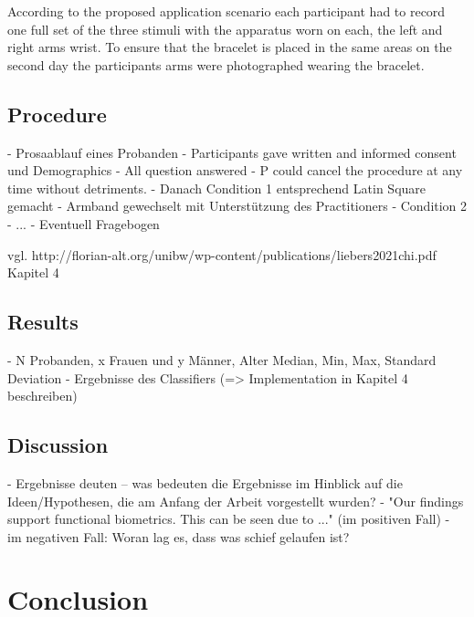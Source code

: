 According to the proposed application scenario each participant had to record one full set of the three stimuli with the apparatus worn on each, the left and right arms wrist.
To ensure that the bracelet is placed in the same areas on the second day the participants arms were photographed wearing the bracelet.

\subsection{Procedure}
- Prosaablauf eines Probanden
- Participants gave written and informed consent und Demographics
- All question answered
- P could cancel the procedure at any time without detriments.
- Danach Condition 1 entsprechend Latin Square gemacht
- Armband gewechselt mit Unterstützung des Practitioners
- Condition 2
- ...
- Eventuell Fragebogen

vgl. http://florian-alt.org/unibw/wp-content/publications/liebers2021chi.pdf Kapitel 4

\subsection{Results}
- N Probanden, x Frauen und y Männer, Alter Median, Min, Max, Standard Deviation
- Ergebnisse des Classifiers (=> Implementation in Kapitel 4 beschreiben)

\subsection{Discussion}

- Ergebnisse deuten -- was bedeuten die Ergebnisse im Hinblick auf die Ideen/Hypothesen, die am Anfang der Arbeit vorgestellt wurden?
- "Our findings support functional biometrics. This can be seen due to ..." (im positiven Fall)
- im negativen Fall: Woran lag es, dass was schief gelaufen ist?


\section{Conclusion}
